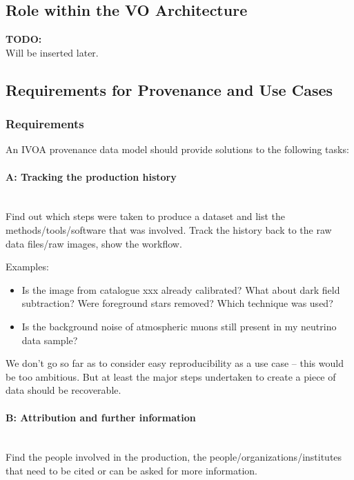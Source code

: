 \documentclass[11pt,a4paper]{ivoa}
\newcommand{\TODO}[1]{%
    \noindent%
    \colorbox{todocolor}{%
            \parbox{0.85\linewidth}{\sffamily \textbf{TODO:}\\
            #1}
    }%
    \vspace{2pt}

}
\newcommand{\paragraphlb}[1]{\paragraph{#1}\mbox{}\\} %
\begin{document}
\subsection{Role within the VO Architecture}
\TODO{Will be inserted later.}




\subsection{Requirements for Provenance and Use Cases}
\subsubsection{Requirements}\label{sec:requirements}

An IVOA provenance data model should provide solutions to the following tasks:

\paragraphlb{A: Tracking the production history}
        Find out which steps were taken to produce a dataset and list the methods/tools/software that was involved. 
        Track the history back to the raw data files/raw images, show the workflow.

        \noindent Examples: 
        \begin{itemize}
            \item Is the image from catalogue xxx already calibrated?
What about dark field subtraction? Were foreground stars removed? Which technique
was used?  
            
            \item Is the background noise of atmospheric muons still present in my neutrino data sample?  
        \end{itemize}

        We don't go so far as to consider easy reproducibility as a use case -- this would be too ambitious. But at least the 
        major steps undertaken to create a piece of data should be recoverable.

      
\paragraphlb{B: Attribution and further information}
        Find the people involved in the production, the people/organizations/institutes that need to be cited or can be asked for more information.
\end{document}

